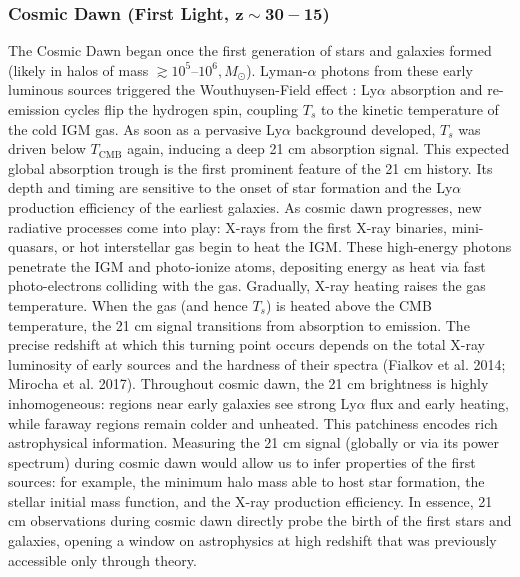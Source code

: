 \documentclass[floats,floatfix,showpacs,amssymb,prd,superscriptaddress,nofootinbib]{revtex4-2} %
\begin{document}
\subsubsection{Cosmic Dawn (First Light, $\mathbf{z \sim 30-15}$)}
The Cosmic Dawn began once the first generation of stars and galaxies formed (likely in halos of mass $\gtrsim10^5$–$10^6,M_\odot$). Lyman-$\alpha$ photons from these early luminous sources triggered the Wouthuysen-Field effect \citep{Wouthuysen_1952, Field_1958}: Ly$\alpha$ absorption and re-emission cycles flip the hydrogen spin, coupling $T_s$ to the kinetic temperature of the cold IGM gas. As soon as a pervasive Ly$\alpha$ background developed, $T_s$ was driven below $T_{\text{CMB}}$ again, inducing a deep 21 cm absorption signal. This expected global absorption trough is the first prominent feature of the 21 cm history. %
Its depth and timing are sensitive to the onset of star formation and the Ly$\alpha$ production efficiency of the earliest galaxies. As cosmic dawn progresses, new radiative processes come into play: X-rays from the first X-ray binaries, mini-quasars, or hot interstellar gas begin to heat the IGM. These high-energy photons penetrate the IGM and photo-ionize atoms, depositing energy as heat via fast photo-electrons colliding with the gas. Gradually, X-ray heating raises the gas temperature. When the gas (and hence $T_s$) is heated above the CMB temperature, the 21 cm signal transitions from absorption to emission. The precise redshift at which this turning point occurs depends on the total X-ray luminosity of early sources and the hardness of their spectra (Fialkov et al. 2014; Mirocha et al. 2017). Throughout cosmic dawn, the 21 cm brightness is highly inhomogeneous: regions near early galaxies see strong Ly$\alpha$ flux and early heating, while faraway regions remain colder and unheated. This patchiness encodes rich astrophysical information. Measuring the 21 cm signal (globally or via its power spectrum) during cosmic dawn would allow us to infer properties of the first sources: for example, the minimum halo mass able to host star formation, the stellar initial mass function, and the X-ray production efficiency.
In essence, 21 cm observations during cosmic dawn directly probe the birth of the first stars and galaxies, opening a window on astrophysics at high redshift that was previously accessible only through theory.
\end{document}

